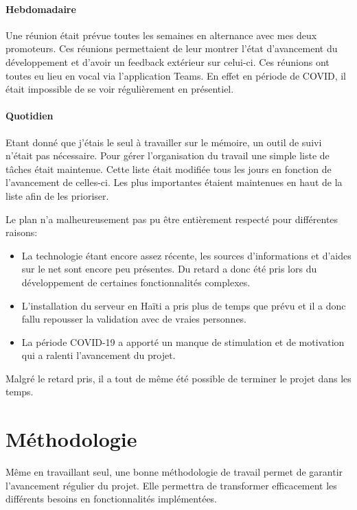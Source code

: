 \documentclass{EPL-master-thesis-covers-FR}
\begin{document}
				\paragraph*{Hebdomadaire} 
				Une réunion était prévue toutes les semaines en alternance avec mes deux promoteurs. Ces réunions permettaient de leur montrer l'état d'avancement du développement et d'avoir un feedback extérieur sur celui-ci. 
				Ces réunions ont toutes eu lieu en vocal via l'application Teams. En effet en période de COVID, il était impossible de se voir régulièrement en présentiel.
				
				\paragraph*{Quotidien}
				Etant donné que j'étais le seul à travailler sur le mémoire, un outil de suivi n'était pas nécessaire. Pour gérer l'organisation du travail une simple liste de tâches était maintenue. Cette liste était modifiée tous les jours en fonction de l'avancement de celles-ci. Les plus importantes étaient maintenues en haut de la liste afin de les prioriser. 
				
				Le plan n'a malheureusement pas pu être entièrement respecté pour différentes raisons:
				\begin{itemize}
					\item La technologie étant encore assez récente, les sources d'informations et d'aides sur le net sont encore peu présentes. Du retard a donc été pris lors du développement de certaines fonctionnalités complexes.
					\item L'installation du serveur en Haïti a pris plus de temps que prévu et il a donc fallu repousser la validation avec de vraies personnes. 
					\item La période COVID-19 a apporté un manque de stimulation et de motivation qui a ralenti l'avancement du projet.
				
				\end{itemize}				
				
				Malgré le retard pris, il a tout de même été possible de terminer le projet dans les temps.
				
				
		\section{Méthodologie}
			Même en travaillant seul, une bonne méthodologie de travail permet de garantir l'avancement régulier du projet. Elle permettra de transformer efficacement les différents besoins en fonctionnalités implémentées.
			
\end{document}
